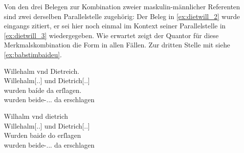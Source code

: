 Von den drei Belegen zur Kombination zweier maskulin-männlicher Referenten sind
zwei derselben Parallelstelle zugehörig: Der Beleg in \cref{ex:dietwill_2}
wurde eingangs zitiert, er sei hier noch einmal im Kontext seiner
Parallelstelle in \cref{ex:dietwill_3} wiedergegeben. Wie erwartet zeigt der
Quantor für diese Merkmalskombination die Form  in allen Fällen.
Zur dritten Stelle mit  siehe \cref{ex:babstimbaideu}.

\begin{exe}
\ex \label{ex:dietwill} %
	\begin{xlist}

	\ex \label{ex:dietwill_2}
		\begin{taggedline}{\parencites[\pno~83vb,36--37]{kc:C1}}
		\gll Willehalm vnd Dietreich. \\
			Willehalm[\Nom.\Sg.\MascM] und Dietrich[\Nom.\Sg.\MascM] \\
	\sn \gll wurden baíde da erſlagen. \\
			wurden beide-\Nom.\Pl.\MascM.\St{} da erschlagen \\
		\end{taggedline}

	\ex \label{ex:dietwill_3}
		\gll Wilhalm vnd dietrich \\
			Willehalm[\Nom.\Sg.\MascM] und Dietrich[\Nom.\Sg.\MascM] \\
	\sn \gll Wurden baide do erſlagen \\
			wurden beide-\Nom.\Pl.\MascM.\St{} da erschlagen \\
		\begin{taggedline}{\parencites[\pno~95vb,12--13]{kc:K}}
		\trans {}
		\end{taggedline}

	\end{xlist}
\end{exe}

